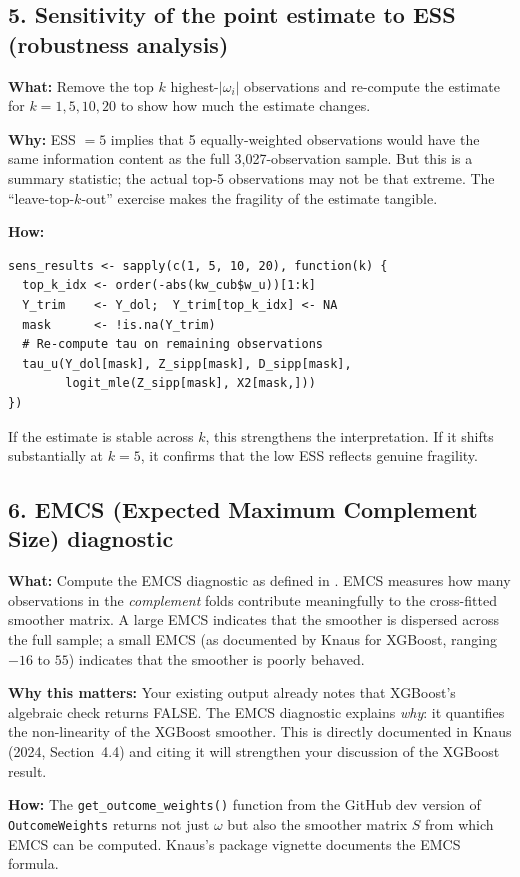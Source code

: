 \documentclass[12pt, a4paper]{article}
\begin{document}
\subsection*{5. Sensitivity of the point estimate to ESS (robustness analysis)}

\textbf{What:} Remove the top $k$ highest-$|\omega_i|$ observations and
re-compute the estimate for $k = 1, 5, 10, 20$ to show how much the
estimate changes.

\textbf{Why:} ESS $= 5$ implies that 5 equally-weighted observations would
have the same information content as the full 3,027-observation sample. But
this is a summary statistic; the actual top-5 observations may not be that
extreme. The ``leave-top-$k$-out'' exercise makes the fragility of the
estimate tangible.

\textbf{How:}
\begin{verbatim}
sens_results <- sapply(c(1, 5, 10, 20), function(k) {
  top_k_idx <- order(-abs(kw_cub$w_u))[1:k]
  Y_trim    <- Y_dol;  Y_trim[top_k_idx] <- NA
  mask      <- !is.na(Y_trim)
  # Re-compute tau on remaining observations
  tau_u(Y_dol[mask], Z_sipp[mask], D_sipp[mask],
        logit_mle(Z_sipp[mask], X2[mask,]))
})
\end{verbatim}
If the estimate is stable across $k$, this strengthens the interpretation.
If it shifts substantially at $k = 5$, it confirms that the low ESS reflects
genuine fragility.

\subsection*{6. EMCS (Expected Maximum Complement Size) diagnostic}

\textbf{What:} Compute the EMCS diagnostic as defined in
\citet[][Appendix~A.3]{knaus2024outcome}. EMCS measures how many observations
in the \emph{complement} folds contribute meaningfully to the cross-fitted
smoother matrix. A large EMCS indicates that the smoother is dispersed across
the full sample; a small EMCS (as documented by Knaus for XGBoost, ranging
$-16$ to $55$) indicates that the smoother is poorly behaved.

\textbf{Why this matters:} Your existing output already notes that XGBoost's
algebraic check returns FALSE. The EMCS diagnostic explains \emph{why}: it
quantifies the non-linearity of the XGBoost smoother. This is directly
documented in Knaus (2024, Section~4.4) and citing it will strengthen your
discussion of the XGBoost result.

\textbf{How:} The \texttt{get\_outcome\_weights()} function from the GitHub
dev version of \texttt{OutcomeWeights} returns not just $\omega$ but also
the smoother matrix $S$ from which EMCS can be computed. Knaus's package
vignette documents the EMCS formula.
\end{document}
